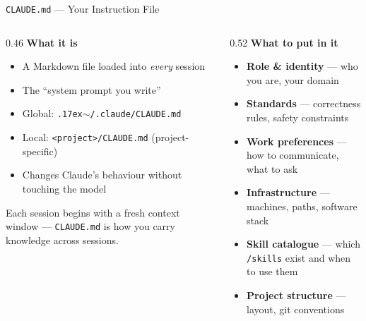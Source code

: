 \documentclass[aspectratio=169, 10pt]{beamer}
\begin{document}
\begin{frame}{\texttt{CLAUDE.md} --- Your Instruction File}
  \begin{columns}[T]
    \begin{column}{0.46\textwidth}
      \textbf{\color{biokteal}What it is}
      \begin{itemize}[label=\textbullet]\setlength\itemsep{3pt}
        \item A Markdown file loaded into \emph{every} session
        \item The ``system prompt you write''
        \item Global: \texttt{{\raise.17ex\hbox{$\scriptstyle\sim$}}/.claude/CLAUDE.md}
        \item Local: \texttt{<project>/CLAUDE.md} (project-specific)
        \item Changes Claude's behaviour without touching the model
      \end{itemize}
      \vspace{0.5em}
      \begin{block}{}
        \small Each session begins with a fresh context window --- \texttt{CLAUDE.md} is how you carry knowledge across sessions.
      \end{block}
    \end{column}
    \begin{column}{0.52\textwidth}
      \textbf{\color{biokteal}What to put in it}
      \begin{itemize}[label=\textbullet]\setlength\itemsep{3pt}
        \item \textbf{Role \& identity} --- who you are, your domain
        \item \textbf{Standards} --- correctness rules, safety constraints
        \item \textbf{Work preferences} --- how to communicate, what to ask
        \item \textbf{Infrastructure} --- machines, paths, software stack
        \item \textbf{Skill catalogue} --- which \texttt{/skills} exist and when to use them
        \item \textbf{Project structure} --- layout, git conventions
      \end{itemize}
    \end{column}
  \end{columns}
\end{frame}
\end{document}
